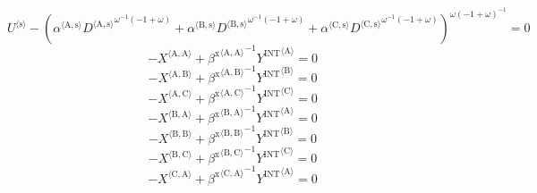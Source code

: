 \begin{equation}
{U}^{\langle \mathrm{s}\rangle} - \left({{\alpha}^{\langle \mathrm{\mathrm{A}},\mathrm{\mathrm{s}}\rangle}} {{{D}^{\langle \mathrm{A},\mathrm{s}\rangle}}^{{\omega}^{-1} \left(-1 + \omega\right)}} + {{\alpha}^{\langle \mathrm{\mathrm{B}},\mathrm{\mathrm{s}}\rangle}} {{{D}^{\langle \mathrm{B},\mathrm{s}\rangle}}^{{\omega}^{-1} \left(-1 + \omega\right)}} + {{\alpha}^{\langle \mathrm{\mathrm{C}},\mathrm{\mathrm{s}}\rangle}} {{{D}^{\langle \mathrm{C},\mathrm{s}\rangle}}^{{\omega}^{-1} \left(-1 + \omega\right)}}\right)^{{\omega} \left(-1 + \omega\right)^{-1}} = 0
\end{equation}
\begin{equation}
-{X}^{\langle \mathrm{A},\mathrm{A}\rangle} + {{\beta^{\mathrm{x}}}^{\langle \mathrm{\mathrm{A}},\mathrm{\mathrm{A}}\rangle}}^{-1} {{Y^{\mathrm{INT}}}^{\langle \mathrm{A}\rangle}} = 0
\end{equation}
\begin{equation}
-{X}^{\langle \mathrm{A},\mathrm{B}\rangle} + {{\beta^{\mathrm{x}}}^{\langle \mathrm{\mathrm{A}},\mathrm{\mathrm{B}}\rangle}}^{-1} {{Y^{\mathrm{INT}}}^{\langle \mathrm{B}\rangle}} = 0
\end{equation}
\begin{equation}
-{X}^{\langle \mathrm{A},\mathrm{C}\rangle} + {{\beta^{\mathrm{x}}}^{\langle \mathrm{\mathrm{A}},\mathrm{\mathrm{C}}\rangle}}^{-1} {{Y^{\mathrm{INT}}}^{\langle \mathrm{C}\rangle}} = 0
\end{equation}
\begin{equation}
-{X}^{\langle \mathrm{B},\mathrm{A}\rangle} + {{\beta^{\mathrm{x}}}^{\langle \mathrm{\mathrm{B}},\mathrm{\mathrm{A}}\rangle}}^{-1} {{Y^{\mathrm{INT}}}^{\langle \mathrm{A}\rangle}} = 0
\end{equation}
\begin{equation}
-{X}^{\langle \mathrm{B},\mathrm{B}\rangle} + {{\beta^{\mathrm{x}}}^{\langle \mathrm{\mathrm{B}},\mathrm{\mathrm{B}}\rangle}}^{-1} {{Y^{\mathrm{INT}}}^{\langle \mathrm{B}\rangle}} = 0
\end{equation}
\begin{equation}
-{X}^{\langle \mathrm{B},\mathrm{C}\rangle} + {{\beta^{\mathrm{x}}}^{\langle \mathrm{\mathrm{B}},\mathrm{\mathrm{C}}\rangle}}^{-1} {{Y^{\mathrm{INT}}}^{\langle \mathrm{C}\rangle}} = 0
\end{equation}
\begin{equation}
-{X}^{\langle \mathrm{C},\mathrm{A}\rangle} + {{\beta^{\mathrm{x}}}^{\langle \mathrm{\mathrm{C}},\mathrm{\mathrm{A}}\rangle}}^{-1} {{Y^{\mathrm{INT}}}^{\langle \mathrm{A}\rangle}} = 0
\end{equation}
